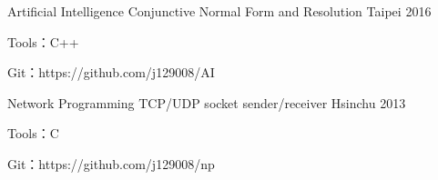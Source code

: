 
\begin{cventries}

  \cventry
    {Artificial Intelligence}
    {Conjunctive Normal Form and Resolution}
    {Taipei} %
    {2016} %
    {
      \begin{cvitems} %
        \item {Tools：C++}
        \item {Git：https://github.com/j129008/AI}
      \end{cvitems}
    }


  \cventry
    {Network Programming}
    {TCP/UDP socket sender/receiver}
    {Hsinchu} %
    {2013} %
    {
      \begin{cvitems} %
        \item {Tools：C}
        \item {Git：https://github.com/j129008/np}
      \end{cvitems}
    }

\end{cventries}
